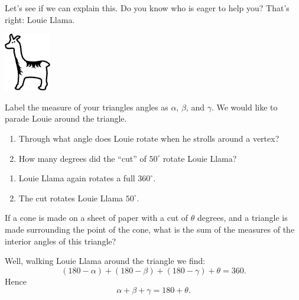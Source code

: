 \documentclass[nooutcomes,noauthor,handout]{ximera}
\begin{document}
\begin{question}
  Let's see if we can explain this. Do you know who is eager to help
you? That's right: Louie Llama.
\begin{center}
\includegraphics[height=1in]{llama.pdf}
\end{center}

Label the measure of your triangles angles as $\alpha$, $\beta$, and
$\gamma$. We would like to parade Louie around the triangle.
\begin{enumerate}
\item Through what angle does Louie rotate when he strolls around a
  vertex?
\item How many degrees did the ``cut'' of $50^\circ$ rotate Louie
  Llama?
\end{enumerate}
\begin{freeResponse}
  \begin{enumerate}
  \item Louie Llama again rotates a full $360^\circ$.
  \item The cut rotates Louie Llama $50^\circ$.
  \end{enumerate}
\end{freeResponse}
\end{question}

\mynewpage


\begin{question}
If a cone is made on a sheet of paper with a cut of $\theta$ degrees,
and a triangle is made surrounding the point of the cone, what is the
sum of the measures of the interior angles of this triangle?
\begin{freeResponse}
  Well, walking Louie Llama around the triangle we find:
  \[
  (180-\alpha) + (180-\beta) + (180-\gamma) + \theta = 360.
  \]
  Hence
  \[
  \alpha + \beta + \gamma = 180 + \theta.
  \]
\end{freeResponse}
\end{question}
\end{document}
